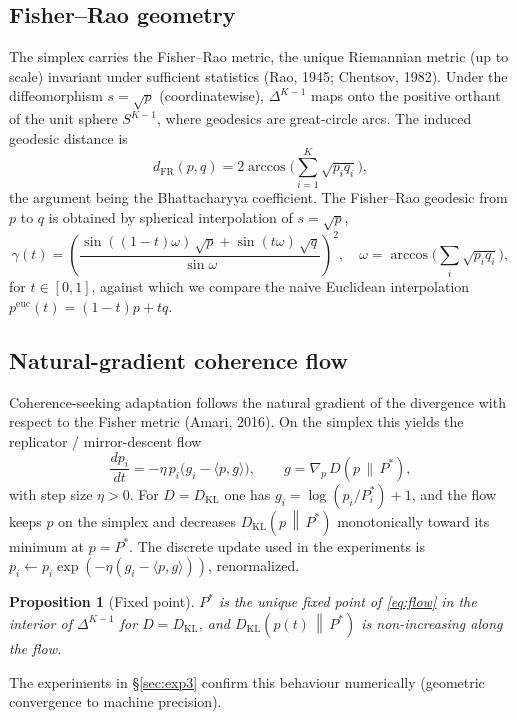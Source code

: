 \documentclass[11pt]{article}
\newtheorem{proposition}{Proposition}
\theoremstyle{remark}
\newcommand{\Pstar}{P^{*}}
\newcommand{\KL}[2]{D_{\mathrm{KL}}\!\left(#1 \,\middle\|\, #2\right)}
\begin{document}
\subsection{Fisher--Rao geometry}
The simplex carries the Fisher--Rao metric, the unique Riemannian metric (up to
scale) invariant under sufficient statistics (Rao, 1945; Chentsov, 1982). Under
the diffeomorphism $s = \sqrt{p}$ (coordinatewise), $\Delta^{K-1}$ maps onto the
positive orthant of the unit sphere $S^{K-1}$, where geodesics are great-circle
arcs. The induced geodesic distance is
\begin{equation}
d_{\mathrm{FR}}(p,q) = 2\arccos\!\Big( \textstyle\sum_{i=1}^{K} \sqrt{p_i q_i} \Big),
\label{eq:frdist}
\end{equation}
the argument being the Bhattacharyya coefficient. The Fisher--Rao geodesic from
$p$ to $q$ is obtained by spherical interpolation of $s=\sqrt{p}$,
\begin{equation}
\gamma(t) = \left( \frac{\sin((1-t)\omega)\,\sqrt{p} + \sin(t\omega)\,\sqrt{q}}{\sin\omega} \right)^{2},
\quad \omega = \arccos\!\big(\textstyle\sum_i \sqrt{p_i q_i}\big),
\label{eq:geo}
\end{equation}
for $t\in[0,1]$, against which we compare the naive Euclidean interpolation
$p^{\mathrm{euc}}(t) = (1-t)p + tq$.

\subsection{Natural-gradient coherence flow}
Coherence-seeking adaptation follows the natural gradient of the divergence with
respect to the Fisher metric (Amari, 2016). On the simplex this yields the
replicator / mirror-descent flow
\begin{equation}
\frac{dp_i}{dt} = -\eta\, p_i \big( g_i - \langle p, g\rangle \big),
\qquad g = \nabla_p\, D\!\left(p \,\|\, \Pstar\right),
\label{eq:flow}
\end{equation}
with step size $\eta>0$. For $D = D_{\mathrm{KL}}$ one has
$g_i = \log(p_i/\Pstar_i)+1$, and the flow keeps $p$ on the simplex and
decreases $\KL{p}{\Pstar}$ monotonically toward its minimum at $p=\Pstar$. The
discrete update used in the experiments is
$p_i \leftarrow p_i \exp(-\eta(g_i - \langle p,g\rangle))$, renormalized.

\begin{proposition}[Fixed point]
$\Pstar$ is the unique fixed point of \eqref{eq:flow} in the interior of
$\Delta^{K-1}$ for $D=D_{\mathrm{KL}}$, and $\KL{p(t)}{\Pstar}$ is
non-increasing along the flow.
\end{proposition}
\noindent The experiments in \S\ref{sec:exp3} confirm this behaviour
numerically (geometric convergence to machine precision).
\end{document}
